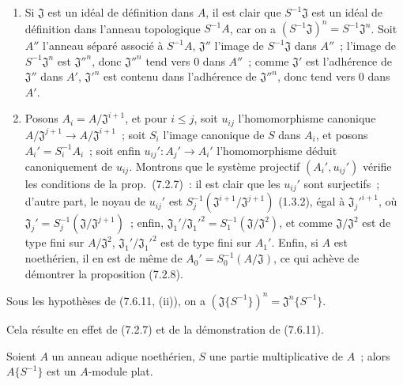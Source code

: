 \begin{enumerate}
  \item[\rm(i)] Si $\mathfrak J$ est un idéal de définition dans $A$, il est
    clair que $S^{-1}\mathfrak J$ est un idéal de définition dans l'anneau
    topologique $S^{-1}A$, car on a
    $(S^{-1}\mathfrak J)^n=S^{-1}\mathfrak J^n$. Soit $A''$ l'anneau séparé
    associé à $S^{-1}A$, $\mathfrak J''$ l'image de $S^{-1}\mathfrak J$ dans
    $A''$~; l'image de $S^{-1}\mathfrak J^n$ est $\mathfrak J''^n$, donc
    $\mathfrak J''^n$ tend vers 0 dans $A''$~; comme $\mathfrak J'$ est
    l'adhérence de $\mathfrak J''$ dans $A'$, $\mathfrak J'^n$ est contenu
    dans l'adhérence de $\mathfrak J''^n$, donc tend vers 0 dans $A'$.
  \item[\rm(ii)] Posons $A_i=A/\mathfrak J^{i+1}$, et pour $i\leq j$, soit
    $u_{ij}$ l'homomorphisme canonique
    $A/\mathfrak J^{j+1}\to A/\mathfrak J^{i+1}$~; soit $S_i$ l'image
    canonique de $S$ dans $A_i$, et posons $A_i'=S_i^{-1}A_i$~; soit enfin
    $u_{ij}':A_j'\to A_i'$ l'homomorphisme déduit canoniquement de $u_{ij}$.
    Montrons que le système projectif $(A_i',u_{ij}')$ vérifie les conditions
    de la prop.~(7.2.7)~: il est clair que les $u_{ij}'$ sont surjectifs~;
    d'autre part, le noyau de $u_{ij}'$ est
    $S_j^{-1}(\mathfrak J^{i+1}/\mathfrak J^{j+1})$ (1.3.2), égal à
    $\mathfrak J_j'^{i+1}$, où
    $\mathfrak J_j'=S_j^{-1}(\mathfrak J/\mathfrak J^{j+1})$~; enfin,
    $\mathfrak J_1'/\mathfrak J_1'^2=S_1^{-1}(\mathfrak J/\mathfrak J^2)$,
    et comme $\mathfrak J/\mathfrak J^2$ est de type fini sur
    $A/\mathfrak J^2$, $\mathfrak J_1'/\mathfrak J_1'^2$ est de type fini
    sur $A_1'$. Enfin, si $A$ est noethérien, il en est de même de
    $A_0'=S_0^{-1}(A/\mathfrak J)$, ce qui achève de démontrer la proposition
    (7.2.8).
\end{enumerate}

\begin{corollary}[7.6.12]
\label{0.7.6.12-fr}
Sous les hypothèses de (7.6.11, (ii)), on a
$(\mathfrak J\{S^{-1}\})^n=\mathfrak J^n\{S^{-1}\}$.
\end{corollary}

Cela résulte en effet de (7.2.7) et de la démonstration de (7.6.11).

\begin{proposition}[7.6.13]
\label{0.7.6.13-fr}
Soient $A$ un anneau adique noethérien, $S$ une partie multiplicative de $A$~;
alors $A\{S^{-1}\}$ est un $A$-module plat.
\end{proposition}

